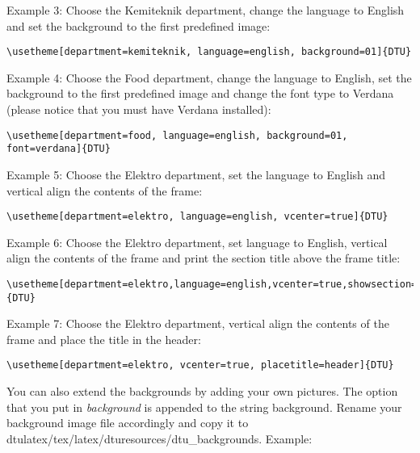 \documentclass{article}
\begin{document}
\begin{enumerate}
                Example 3:
                Choose the Kemiteknik department, change the language to English and set the background to the first predefined image:
                \begin{lstlisting}[name=code,firstnumber=2]
\usetheme[department=kemiteknik, language=english, background=01]{DTU}
                \end{lstlisting}
                
                Example 4:
                Choose the Food department, change the language to English, set the background to the first predefined image and change the font type to Verdana (please notice that you must have Verdana installed):
                \begin{lstlisting}[name=code,firstnumber=2]
\usetheme[department=food, language=english, background=01, font=verdana]{DTU}
                \end{lstlisting}
                
                Example 5:
                Choose the Elektro department, set the language to English and vertical align the contents of the frame:
                \begin{lstlisting}[name=code,firstnumber=2]
\usetheme[department=elektro, language=english, vcenter=true]{DTU}
                \end{lstlisting}
                
                Example 6:
                Choose the Elektro department, set language to English, vertical align the contents of the frame and print the section title above the frame title:
                \begin{lstlisting}[name=code,firstnumber=2]
\usetheme[department=elektro,language=english,vcenter=true,showsection=true]{DTU}
                \end{lstlisting}
                
                Example 7:
                Choose the Elektro department, vertical align the contents of the frame and place the title in the header:
                \begin{lstlisting}[name=code,firstnumber=2]
\usetheme[department=elektro, vcenter=true, placetitle=header]{DTU}
                \end{lstlisting}
                
                You can also extend the backgrounds by adding your own pictures. The option that you put in \textit{background} is appended to the string {\color{blue}background}. Rename your background image file accordingly and copy it to {\color{blue}dtulatex/tex/latex/dturesources/dtu\_backgrounds}. Example:
                

\end{enumerate}
\end{document}
